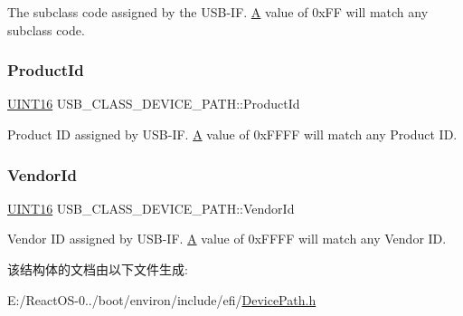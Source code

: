 The subclass code assigned by the U\+S\+B-\/\+IF. \hyperlink{struct_a}{A} value of 0x\+FF will match any subclass code. \mbox{\label{struct_u_s_b___c_l_a_s_s___d_e_v_i_c_e___p_a_t_h_ab28b7fc4217d4656f113d62b2b4e1bba}} 
\subsubsection{\texorpdfstring{Product\+Id}{ProductId}}
{\footnotesize\ttfamily \hyperlink{_processor_bind_8h_a09f1a1fb2293e33483cc8d44aefb1eb1}{U\+I\+N\+T16} U\+S\+B\+\_\+\+C\+L\+A\+S\+S\+\_\+\+D\+E\+V\+I\+C\+E\+\_\+\+P\+A\+T\+H\+::\+Product\+Id}

Product ID assigned by U\+S\+B-\/\+IF. \hyperlink{struct_a}{A} value of 0x\+F\+F\+FF will match any Product ID. \mbox{\label{struct_u_s_b___c_l_a_s_s___d_e_v_i_c_e___p_a_t_h_aeecbb26edc08c1f536f1e58a1b4e8e07}} 
\subsubsection{\texorpdfstring{Vendor\+Id}{VendorId}}
{\footnotesize\ttfamily \hyperlink{_processor_bind_8h_a09f1a1fb2293e33483cc8d44aefb1eb1}{U\+I\+N\+T16} U\+S\+B\+\_\+\+C\+L\+A\+S\+S\+\_\+\+D\+E\+V\+I\+C\+E\+\_\+\+P\+A\+T\+H\+::\+Vendor\+Id}

Vendor ID assigned by U\+S\+B-\/\+IF. \hyperlink{struct_a}{A} value of 0x\+F\+F\+FF will match any Vendor ID. 

该结构体的文档由以下文件生成\+:\begin{DoxyCompactItemize}
\item 
E\+:/\+React\+O\+S-\/0../boot/environ/include/efi/\hyperlink{_device_path_8h}{Device\+Path.\+h}\end{DoxyCompactItemize}
